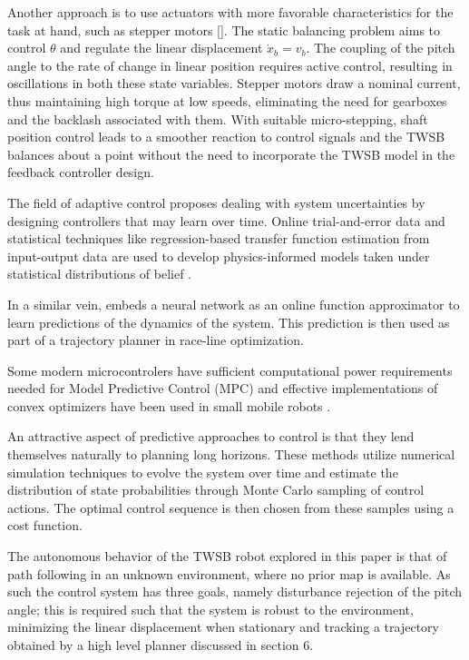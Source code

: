         Another approach is to use actuators with more favorable characteristics for the task at hand, such as stepper motors []. 
        The static balancing problem aims to control $\theta$ and regulate the linear displacement $\dot x_b=v_b$. The coupling of the 
        pitch angle to the rate of change in linear position requires active control, resulting in oscillations in both these state variables. 
        Stepper motors draw a nominal current, thus maintaining high torque at low speeds, eliminating the need for gearboxes and the 
        backlash associated with them. With suitable micro-stepping, shaft position control 
        leads to a smoother reaction to control signals and the TWSB balances about a point without the need to incorporate the  
        TWSB model in the feedback controller design. 
            
        The field of adaptive control proposes dealing with system uncertainties by designing controllers that may 
        learn over time. Online trial-and-error data and statistical techniques like regression-based transfer
        function estimation from input-output data are used to develop physics-informed models taken under statistical 
        distributions of belief \cite{benosman2018model}.         
                
        In a similar vein, \cite{williams2016aggressive} embeds a neural network as an online function approximator to learn 
        predictions of the dynamics of the system. This prediction is then used as part of a trajectory planner in race-line optimization. 
    
        Some modern microcontrolers have sufficient computational power requirements needed for Model Predictive Control (MPC) and 
        effective implementations of convex optimizers \cite{nguyen2024tinympc} have been used in small mobile robots \cite{giernacki2017crazyflie}.
            
        An attractive aspect of predictive approaches to control is that they lend themselves naturally to 
        planning long horizons. These methods utilize numerical simulation techniques to evolve the system over time 
        and estimate the distribution of state probabilities through Monte Carlo sampling of control actions. 
        The optimal control sequence is then chosen from these samples using a cost function.
                
        The autonomous behavior of the TWSB robot explored in this paper is that of path 
        following in an unknown environment, where no prior map is available. As such the 
        control system has three goals, namely disturbance rejection of the pitch angle; 
        this is required such that the system is robust to the environment, minimizing 
        the linear displacement when stationary and tracking a trajectory obtained by a 
        high level planner discussed in section 6. 

